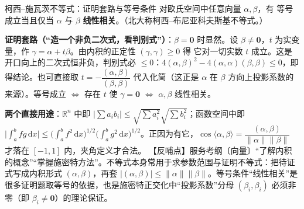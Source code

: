 \begin{fdeep}{柯西–施瓦茨不等式：证明套路与等号条件}
对欧氏空间中任意向量 $\alpha,\beta$，有
\fml{\lvert(\alpha,\beta)\rvert\le\lVert\alpha\rVert\,\lVert\beta\rVert}
等号成立当且仅当 $\alpha$ 与 $\beta$ \textbf{线性相关}。（北大称柯西–布尼亚科夫斯基不等式。）

\textbf{证明套路（“造一个非负二次式，看判别式”）}：$\beta=\mathbf{0}$ 时显然。设 $\beta\ne\mathbf{0}$，$t$ 为实变量，作 $\gamma=\alpha+t\beta$。由内积的正定性 $(\gamma,\gamma)\ge0$ 得
它对一切实数 $t$ 成立。这是开口向上的二次式恒非负，判别式必 $\le0$：$4(\alpha,\beta)^2-4(\alpha,\alpha)(\beta,\beta)\le0$，即得结论。也可直接取 $t=-\dfrac{(\alpha,\beta)}{(\beta,\beta)}$ 代入化简（这正是 $\alpha$ 在 $\beta$ 方向上投影系数的来源）。等号成立 $\iff$ 存在 $t$ 使 $\gamma=\mathbf{0}$ $\iff$ $\alpha,\beta$ 线性相关。

\textbf{两个直接用途}：$\mathbb{R}^n$ 中即 $\lvert\sum a_ib_i\rvert\le\sqrt{\sum a_i^2}\sqrt{\sum b_i^2}$；函数空间中即 $\lvert\int_a^b fg\,\mathrm{d}x\rvert\le\bigl(\int_a^b f^2\,\mathrm{d}x\bigr)^{1/2}\bigl(\int_a^b g^2\,\mathrm{d}x\bigr)^{1/2}$。正因为有它，$\cos\langle\alpha,\beta\rangle=\dfrac{(\alpha,\beta)}{\lVert\alpha\rVert\lVert\beta\rVert}$ 才落在 $[-1,1]$ 内，夹角定义才合法。
【反哺点】服务考纲〔向量〕“了解内积的概念”“掌握施密特方法”。不等式本身常用于求参数范围与证明不等式：把待证式写成内积形式 $(\alpha,\beta)$，再套 $\lvert(\alpha,\beta)\rvert\le\lVert\alpha\rVert\lVert\beta\rVert$。等号条件“线性相关”是很多证明题取等号的依据，也是施密特正交化中“投影系数”分母 $(\beta_i,\beta_i)$ 必须非零（即 $\beta_i\ne\mathbf{0}$）的理论保证。
\end{fdeep}

